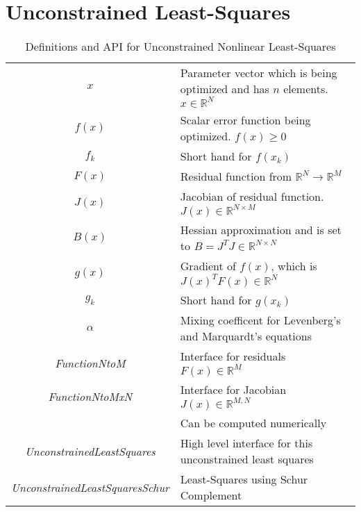 \documentclass[peerreview,compsoc,onecolumn]{IEEEtran}
\newcommand{\R}{\mathbb{R}}
\begin{document}
\section{Unconstrained Least-Squares}
\begin{table*}[h]
\caption{\label{definitions:UNLS}Definitions and API for Unconstrained Nonlinear Least-Squares}
\centering
\begin{tabular}{cl}
$x$ & Parameter vector which is being optimized and has $n$ elements. $x \in \R^N$ \\
$f(x)$ & Scalar error function being optimized. $f(x) \ge 0$ \\
$f_k$ & Short hand for $f(x_k)$ \\
$F(x)$ & Residual function from $\R^N \rightarrow \R^M$ \\
$J(x)$ & Jacobian of residual function. $J(x) \in \R^{N \times M}$\\
$B(x)$ & Hessian approximation and is set to $B=J^TJ \in \R^{N \times N}$ \\
$g(x)$ & Gradient of $f(x)$, which is $J(x)^T  F(x) \in \R^{N}$ \\
$g_k$ & Short hand for $g(x_k)$ \\
$\alpha$ & Mixing coefficent for Levenberg's and Marquardt's equations \\
\textit{FunctionNtoM} & Interface for residuals $F(x) \in \R^M$ \\
\textit{FunctionNtoMxN} & Interface for Jacobian $J(x) \in \R^{M,N}$ \\
& Can be computed numerically \\
\textit{UnconstrainedLeastSquares} & High level interface for this unconstrained least squares \\
\textit{UnconstrainedLeastSquaresSchur} & Least-Squares using Schur Complement
\end{tabular}
\end{table*}
\end{document}
